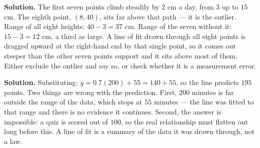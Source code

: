 \documentclass[12pt]{article}
\begin{document}


\textbf{Solution.} The first seven points climb steadily by $2$ cm a day, from $3$ up to $15$ cm. The eighth point, $(8, 40)$, sits far above that path --- it is the outlier. Range of all eight heights: $40-3=37$ cm. Range of the seven without it: $15-3=12$ cm, a third as large. A line of fit drawn through all eight points is dragged upward at the right-hand end by that single point, so it comes out steeper than the other seven points support and it sits above most of them. Either exclude the outlier and say so, or check whether it is a measurement error.



\textbf{Solution.} Substituting: $y = 0.7(200) + 55 = 140 + 55$, so the line predicts $195$ points. Two things are wrong with the prediction. First, $200$ minutes is far outside the range of the data, which stops at $55$ minutes --- the line was fitted to that range and there is no evidence it continues. Second, the answer is impossible: a quiz is scored out of $100$, so the real relationship must flatten out long before this. A line of fit is a summary of the data it was drawn through, not a law.

\end{document}

